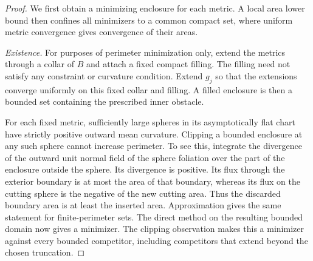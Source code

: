 \begin{proof}
We first obtain a minimizing enclosure for each metric. A local area
lower bound then confines all minimizers to a common compact set, where
uniform metric convergence gives convergence of their areas.

\emph{Existence.} For purposes of perimeter minimization only, extend
the metrics through
a collar of $B$ and attach a fixed compact filling.  The filling need not
satisfy any constraint or curvature condition.  Extend $g_j$ so that the
extensions converge uniformly on this fixed collar and filling.  A filled
enclosure is then a bounded set containing the prescribed inner obstacle.

For each fixed metric, sufficiently large spheres in its asymptotically
flat chart have strictly positive outward mean curvature.  Clipping a
bounded enclosure at any such sphere cannot increase perimeter.  To see
this, integrate the divergence of the outward unit normal field of the
sphere foliation over the part of the enclosure outside the sphere.  Its
divergence is positive.  Its flux through the exterior boundary is at
most the area of that boundary, whereas its flux on the cutting sphere
is the negative of the new cutting area.  Thus the discarded boundary
area is at least the inserted area.  Approximation gives the same
statement for finite-perimeter sets.  The direct method on the resulting
bounded domain now gives a minimizer.  The clipping observation makes
this a minimizer against every bounded competitor, including competitors
that extend beyond the chosen truncation.


\end{proof}
